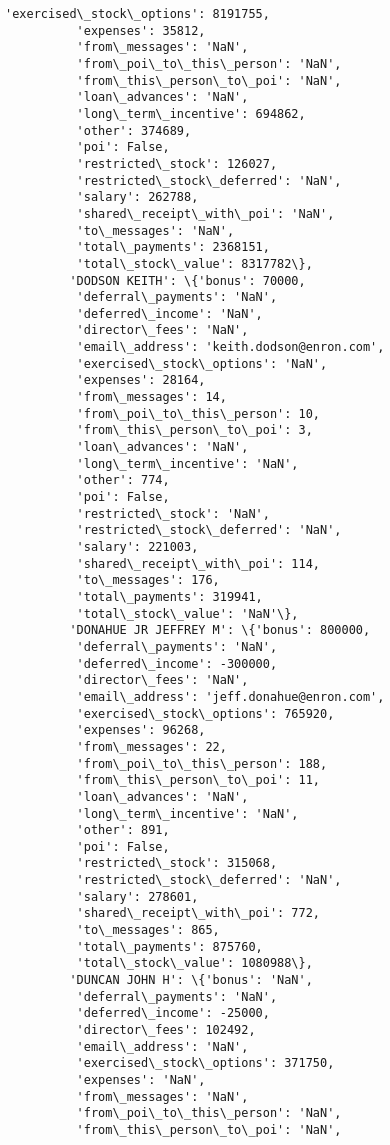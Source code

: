 \documentclass[11pt]{article}
\begin{document}
\begin{Verbatim}[commandchars=\\\{\}]
          'exercised\_stock\_options': 8191755,
          'expenses': 35812,
          'from\_messages': 'NaN',
          'from\_poi\_to\_this\_person': 'NaN',
          'from\_this\_person\_to\_poi': 'NaN',
          'loan\_advances': 'NaN',
          'long\_term\_incentive': 694862,
          'other': 374689,
          'poi': False,
          'restricted\_stock': 126027,
          'restricted\_stock\_deferred': 'NaN',
          'salary': 262788,
          'shared\_receipt\_with\_poi': 'NaN',
          'to\_messages': 'NaN',
          'total\_payments': 2368151,
          'total\_stock\_value': 8317782\},
         'DODSON KEITH': \{'bonus': 70000,
          'deferral\_payments': 'NaN',
          'deferred\_income': 'NaN',
          'director\_fees': 'NaN',
          'email\_address': 'keith.dodson@enron.com',
          'exercised\_stock\_options': 'NaN',
          'expenses': 28164,
          'from\_messages': 14,
          'from\_poi\_to\_this\_person': 10,
          'from\_this\_person\_to\_poi': 3,
          'loan\_advances': 'NaN',
          'long\_term\_incentive': 'NaN',
          'other': 774,
          'poi': False,
          'restricted\_stock': 'NaN',
          'restricted\_stock\_deferred': 'NaN',
          'salary': 221003,
          'shared\_receipt\_with\_poi': 114,
          'to\_messages': 176,
          'total\_payments': 319941,
          'total\_stock\_value': 'NaN'\},
         'DONAHUE JR JEFFREY M': \{'bonus': 800000,
          'deferral\_payments': 'NaN',
          'deferred\_income': -300000,
          'director\_fees': 'NaN',
          'email\_address': 'jeff.donahue@enron.com',
          'exercised\_stock\_options': 765920,
          'expenses': 96268,
          'from\_messages': 22,
          'from\_poi\_to\_this\_person': 188,
          'from\_this\_person\_to\_poi': 11,
          'loan\_advances': 'NaN',
          'long\_term\_incentive': 'NaN',
          'other': 891,
          'poi': False,
          'restricted\_stock': 315068,
          'restricted\_stock\_deferred': 'NaN',
          'salary': 278601,
          'shared\_receipt\_with\_poi': 772,
          'to\_messages': 865,
          'total\_payments': 875760,
          'total\_stock\_value': 1080988\},
         'DUNCAN JOHN H': \{'bonus': 'NaN',
          'deferral\_payments': 'NaN',
          'deferred\_income': -25000,
          'director\_fees': 102492,
          'email\_address': 'NaN',
          'exercised\_stock\_options': 371750,
          'expenses': 'NaN',
          'from\_messages': 'NaN',
          'from\_poi\_to\_this\_person': 'NaN',
          'from\_this\_person\_to\_poi': 'NaN',

\end{Verbatim}
\end{document}
